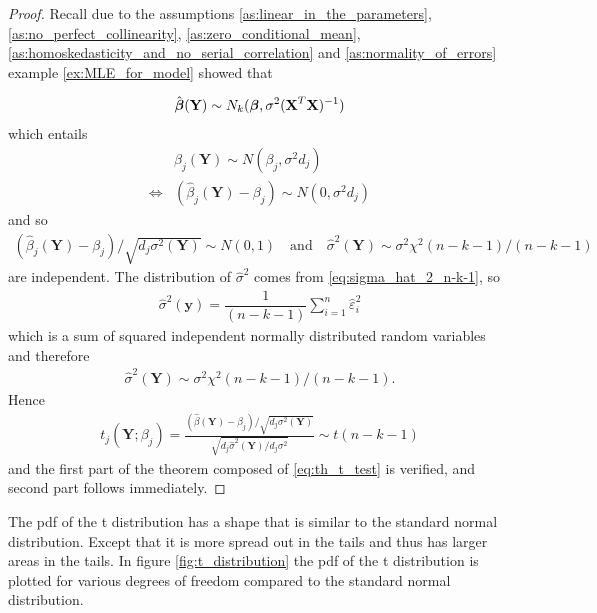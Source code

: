 \begin{proof}
Recall due to the assumptions \ref{as:linear_in_the_parameters}, \ref{as:no_perfect_collinearity}, \ref{as:zero_conditional_mean}, \ref{as:homoskedasticity_and_no_serial_correlation} and \ref{as:normality_of_errors} example \ref{ex:MLE_for_model} showed that

\begin{align} \label{eq:th_t_test}
    \hat{\operatorname{\boldsymbol{\beta}}}(\textbf{Y}) \sim N_k(\operatorname{\boldsymbol{\beta}},\sigma^2(\textbf{X}^T\textbf{X})^{-1})
\end{align}
which entails
\begin{align*}
    &\hat{\beta}_j(\textbf{Y})\sim N(\beta_j , \sigma^2d_j) \\
    \Leftrightarrow &  (\hat{\beta}_j(\textbf{Y})-\beta_j) \sim N(0,\sigma^2d_j)
\end{align*}
and so
\begin{align*}
    (\hat{\beta}_j(\textbf{Y})-\beta_j)/\sqrt{d_j\sigma^2(\textbf{Y})} \sim N(0,1) \quad \text{and} \quad \hat{\sigma}^2(\textbf{Y}) \sim \sigma^2\chi^2 (n-k-1)/(n-k-1)
\end{align*}
are independent.
The distribution of $\hat{\sigma}^2$ comes from \eqref{eq:sigma_hat_2_n-k-1}, so
\begin{align*}
    \hat{\sigma}^2(\textbf{y}) = \dfrac{1}{(n-k-1)}\sum_{i=1}^n \hat{\varepsilon}_i^2
\end{align*}
which is a sum of squared independent normally distributed random variables and therefore
\begin{align*}
\hat{\sigma}^2(\textbf{Y}) \sim \sigma^2 \chi^2(n-k-1)/(n-k-1).    
\end{align*}
Hence
\begin{align*}
    t_j(\textbf{Y};\beta_j)=\frac{(\hat{\beta}(\textbf{Y})-\beta_j)/\sqrt{d_j\sigma^2(\textbf{Y})}}{\sqrt{d_j\hat{\sigma}^2(\textbf{Y})/d_j\sigma^2}} \sim t(n-k-1)
\end{align*}
and the first part of the theorem composed of \eqref{eq:th_t_test} is verified, and second part follows immediately. 
\end{proof}

The pdf of the t distribution has a shape that is similar to the standard normal distribution. Except that it is more spread out in the tails and thus has larger areas in the tails. In figure \ref{fig:t_distribution} the pdf of the t distribution is plotted for various degrees of freedom compared to the standard normal distribution. 

